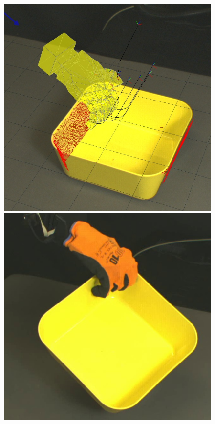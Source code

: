 \begin{figure}
\begin{center}
  \includegraphics[width=\tw]{images/experiments/query/container1-1-s}
 \includegraphics[width=\tw]{images/experiments/exec/container1-s}

\end{center}
\end{figure}
